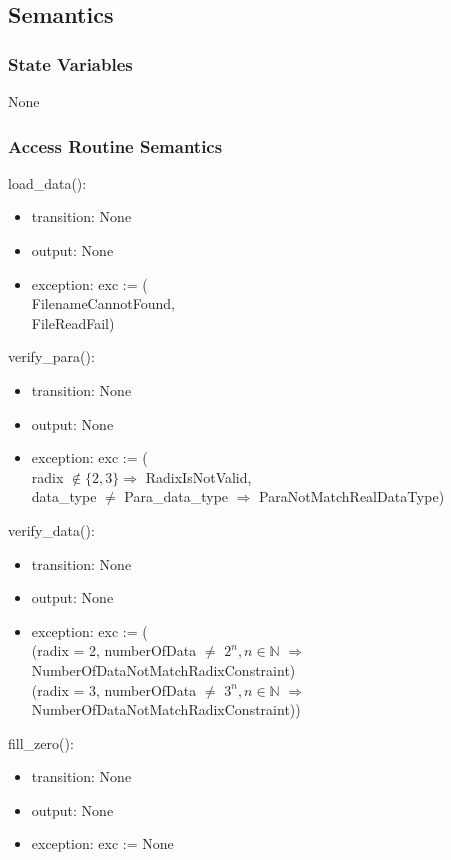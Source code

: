 \documentclass[12pt, titlepage]{article}
\begin{document}
\subsection{Semantics}

\subsubsection{State Variables}
None

\subsubsection{Access Routine Semantics}

load\_data():

\begin{itemize}
\item transition: None
\item output:  None
\item exception: exc := (\\
FilenameCannotFound,\\
 FileReadFail)
\end{itemize}
verify\_para():
\begin{itemize}
\item transition: None
\item output:  None
\item exception: exc := (\\
radix $\not\in \{2, 3\} \Rightarrow$ RadixIsNotValid,\\
data\_type $\neq$ Para\_data\_type $\Rightarrow $ ParaNotMatchRealDataType)
\end{itemize}
verify\_data():
\begin{itemize}
\item transition: None
\item output:  None
\item exception: exc := (\\
(radix = 2, numberOfData $\neq$ $2^n, n\in \mathbb{N}$ $\Rightarrow$ NumberOfDataNotMatchRadixConstraint)\\
(radix = 3, numberOfData $\neq$ $3^n, n\in \mathbb{N}$ $\Rightarrow$ NumberOfDataNotMatchRadixConstraint))
\end{itemize}
fill\_zero():
\begin{itemize}
\item transition: None
\item output:  None
\item exception: exc := None
\end{itemize}
\end{document}
